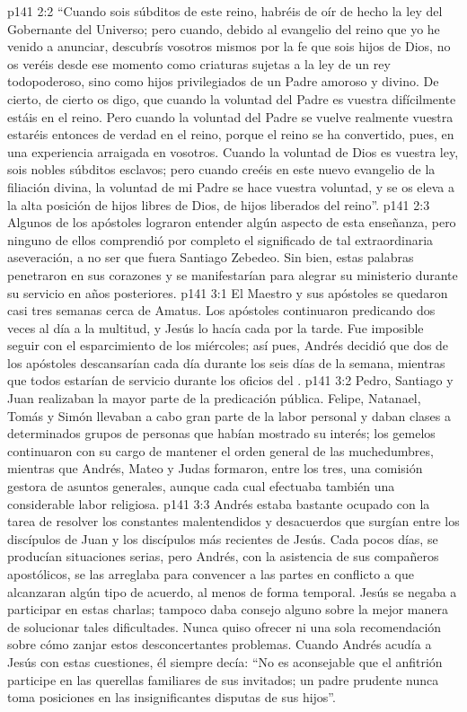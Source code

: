 \vs p141 2:2 “Cuando sois súbditos de este reino, habréis de oír de hecho la ley del Gobernante del Universo; pero cuando, debido al evangelio del reino que yo he venido a anunciar, descubrís vosotros mismos por la fe que sois hijos de Dios, no os veréis desde ese momento como criaturas sujetas a la ley de un rey todopoderoso, sino como hijos privilegiados de un Padre amoroso y divino. De cierto, de cierto os digo, que cuando la voluntad del Padre es vuestra  difícilmente estáis en el reino. Pero cuando la voluntad del Padre se vuelve realmente vuestra  estaréis entonces de verdad en el reino, porque el reino se ha convertido, pues, en una experiencia arraigada en vosotros. Cuando la voluntad de Dios es vuestra ley, sois nobles súbditos esclavos; pero cuando creéis en este nuevo evangelio de la filiación divina, la voluntad de mi Padre se hace vuestra voluntad, y se os eleva a la alta posición de hijos libres de Dios, de hijos liberados del reino”.
\vs p141 2:3 Algunos de los apóstoles lograron entender algún aspecto de esta enseñanza, pero ninguno de ellos comprendió por completo el significado de tal extraordinaria aseveración, a no ser que fuera Santiago Zebedeo. Sin bien, estas palabras penetraron en sus corazones y se manifestarían para alegrar su ministerio durante su servicio en años posteriores.
\vs p141 3:1 El Maestro y sus apóstoles se quedaron casi tres semanas cerca de Amatus. Los apóstoles continuaron predicando dos veces al día a la multitud, y Jesús lo hacía cada  por la tarde. Fue imposible seguir con el esparcimiento de los miércoles; así pues, Andrés decidió que dos de los apóstoles descansarían cada día durante los seis días de la semana, mientras que todos estarían de servicio durante los oficios del .
\vs p141 3:2 Pedro, Santiago y Juan realizaban la mayor parte de la predicación pública. Felipe, Natanael, Tomás y Simón llevaban a cabo gran parte de la labor personal y daban clases a determinados grupos de personas que habían mostrado su interés; los gemelos continuaron con su cargo de mantener el orden general de las muchedumbres, mientras que Andrés, Mateo y Judas formaron, entre los tres, una comisión gestora de asuntos generales, aunque cada cual efectuaba también una considerable labor religiosa.
\vs p141 3:3 Andrés estaba bastante ocupado con la tarea de resolver los constantes malentendidos y desacuerdos que surgían entre los discípulos de Juan y los discípulos más recientes de Jesús. Cada pocos días, se producían situaciones serias, pero Andrés, con la asistencia de sus compañeros apostólicos, se las arreglaba para convencer a las partes en conflicto a que alcanzaran algún tipo de acuerdo, al menos de forma temporal. Jesús se negaba a participar en estas charlas; tampoco daba consejo alguno sobre la mejor manera de solucionar tales dificultades. Nunca quiso ofrecer ni una sola recomendación sobre cómo zanjar estos desconcertantes problemas. Cuando Andrés acudía a Jesús con estas cuestiones, él siempre decía: “No es aconsejable que el anfitrión participe en las querellas familiares de sus invitados; un padre prudente nunca toma posiciones en las insignificantes disputas de sus hijos”.
